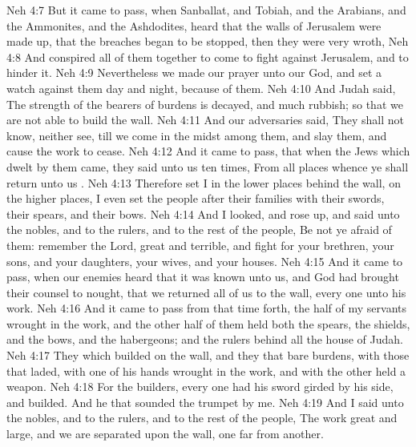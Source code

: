 \vs Neh 4:7 But it came to pass,  when Sanballat, and Tobiah, and the Arabians, and the Ammonites, and the Ashdodites, heard that the walls of Jerusalem were made up,  that the breaches began to be stopped, then they were very wroth,
\vs Neh 4:8 And conspired all of them together to come  to fight against Jerusalem, and to hinder it.
\vs Neh 4:9 Nevertheless we made our prayer unto our God, and set a watch against them day and night, because of them.
\vs Neh 4:10 And Judah said, The strength of the bearers of burdens is decayed, and  much rubbish; so that we are not able to build the wall.
\vs Neh 4:11 And our adversaries said, They shall not know, neither see, till we come in the midst among them, and slay them, and cause the work to cease.
\vs Neh 4:12 And it came to pass, that when the Jews which dwelt by them came, they said unto us ten times, From all places whence ye shall return unto us .
\vs Neh 4:13 Therefore set I in the lower places behind the wall,  on the higher places, I even set the people after their families with their swords, their spears, and their bows.
\vs Neh 4:14 And I looked, and rose up, and said unto the nobles, and to the rulers, and to the rest of the people, Be not ye afraid of them: remember the Lord,  great and terrible, and fight for your brethren, your sons, and your daughters, your wives, and your houses.
\vs Neh 4:15 And it came to pass, when our enemies heard that it was known unto us, and God had brought their counsel to nought, that we returned all of us to the wall, every one unto his work.
\vs Neh 4:16 And it came to pass from that time forth,  the half of my servants wrought in the work, and the other half of them held both the spears, the shields, and the bows, and the habergeons; and the rulers  behind all the house of Judah.
\vs Neh 4:17 They which builded on the wall, and they that bare burdens, with those that laded,  with one of his hands wrought in the work, and with the other  held a weapon.
\vs Neh 4:18 For the builders, every one had his sword girded by his side, and  builded. And he that sounded the trumpet  by me.
\vs Neh 4:19 And I said unto the nobles, and to the rulers, and to the rest of the people, The work  great and large, and we are separated upon the wall, one far from another.
